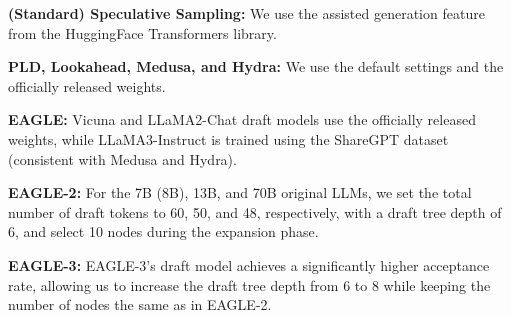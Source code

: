 \documentclass[11pt]{article}
\begin{document}
\textbf{(Standard) Speculative Sampling:} We use the assisted generation feature from the HuggingFace Transformers library.

\textbf{PLD, Lookahead, Medusa, and Hydra:} We use the default settings and the officially released weights.

\textbf{EAGLE:} Vicuna and LLaMA2-Chat draft models use the officially released weights, while LLaMA3-Instruct is trained using the ShareGPT dataset (consistent with Medusa and Hydra).

\textbf{EAGLE-2:} For the 7B (8B), 13B, and 70B original LLMs, we set the total number of draft tokens to 60, 50, and 48, respectively, with a draft tree depth of 6, and select 10 nodes during the expansion phase.

\textbf{EAGLE-3:} EAGLE-3's draft model achieves a significantly higher acceptance rate, allowing us to increase the draft tree depth from 6 to 8 while keeping the number of nodes the same as in EAGLE-2.
\end{document}

